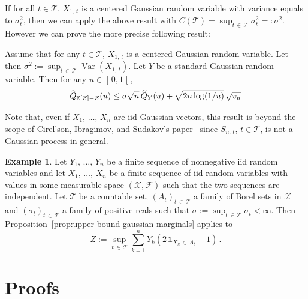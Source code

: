 \documentclass[10pt]{amsart}
\theoremstyle{definition}\newtheorem{defi}[theo]{Definition}\newtheorem{rema}[theo]{Remark}\newtheorem{exam}[theo]{Example}\newtheorem{exem}[theo]{Example}\newtheorem{nota}[theo]{Notation}
\DeclareMathOperator{\Var}{Var}
\newcommand{\bE}{\mathbb{E}}
\newcommand{\cF}{\mathcal{F}}
\newcommand{\cT}{\mathcal{T}}
\newcommand{\cX}{\mathcal{X}}
\newcommand{\intervalleoo}[2]{\mathopen{]} #1\mathclose{}\mathpunct{},#2\mathclose{[}}
\newcommand{\ind}{\mathds{1}}
\let\oldtilde\tilde
\renewcommand*{\tilde}[1]{\mathchoice{\widetilde{#1}}{\widetilde{#1}}{\oldtilde{#1}}{\oldtilde{#1}}}
\begin{document}
If for all $t\in\cT$, $X_{1,\,t}$ is a centered Gaussian random variable with variance equals to $\sigma_t^2$, then we can apply the above result with $C(\cT)=\sup_{t\,\in\,\cT}\sigma^2_t=:\sigma^2$. However we can prove the more precise following result:

\begin{prop}\label{prop:upper bound gaussian marginals}
Assume that for any $t\in\cT$, $X_{1,\,t}$ is a centered Gaussian random variable. Let then $\sigma^2:=\sup_{t\,\in\,\cT} \Var(X_{1,\,t})$. Let $Y$ be a standard Gaussian random variable. Then for any $u\in\intervalleoo 01$,
\[
\tilde Q_{\bE[Z]-Z}(u)\leq \sigma\sqrt n\,\tilde Q_Y(u)+\sqrt{2n\log(1/u)}\,\sqrt{v_n}
\]
\end{prop}

Note that, even if $X_1,\,\ldots,\,X_n$ are iid Gaussian vectors, this result is beyond the scope of Cirel'son, Ibragimov, and Sudakov's paper~\cite{CIS76} since $S_{n,\,t}$, $t\in\cT$, is not a Gaussian process in general.

\begin{exam}
Let $Y_1,\,\ldots,\, Y_n$ be a finite sequence of nonnegative iid random variables and let $X_1,\,\ldots,\, X_n$ be a finite sequence of iid random variables with values in some measurable space $(\cX,\cF)$ such that the two sequences are independent. Let $\cT$ be a countable set, $(A_t)_{t\,\in\,\cT}$ a family of Borel sets in $\cX$ and $(\sigma_t)_{t\,\in\,\cT}$ a family of positive reals such that $\sigma:=\sup_{t\,\in\,\cT}\sigma_t<\infty$. Then Proposition~\ref{prop:upper bound gaussian marginals} applies to
\[
Z:=\sup_{t\,\in\,\cT}\sum_{k=1}^n Y_k\left(2\,\ind_{X_k\,\in \,A_t}-1\right)\,.
\]
\end{exam}


\section{Proofs}\label{section:proofs}
\end{document}
